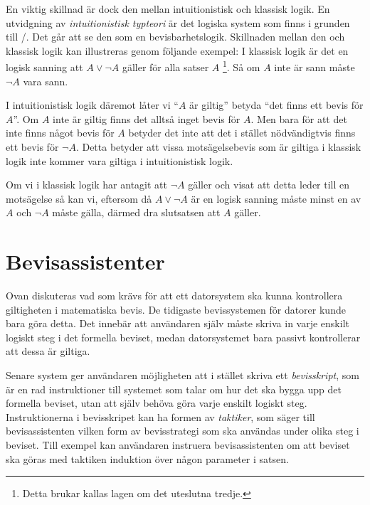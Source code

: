 En viktig skillnad är dock den mellan intuitionistisk och klassisk logik. En
utvidgning av \emph{intuitionistisk typteori}\cite{martin1984intuitionistic} är
det logiska system som finns i grunden till
\coq/\ssr\cite{bertot2004interactive}. Det går att se den som en
bevisbarhetslogik. Skillnaden mellan den och klassisk logik kan illustreras
genom följande exempel: I klassisk logik är det en logisk sanning att $A \lor
\neg A$ gäller för alla satser $A$ \footnote{Detta brukar kallas lagen om det
uteslutna tredje.}. Så om $A$ inte är sann måste $\neg A$ vara
sann\cite{bennet2004forsta}.

I intuitionistisk logik däremot låter vi ``$A$ är giltig'' betyda ``det finns
ett bevis för $A$''. Om $A$ inte är giltig finns det alltså inget bevis för
$A$. Men bara för att det inte finns något bevis för $A$ betyder det inte att
det i stället nödvändigtvis finns ett bevis för $\neg A$. Detta betyder att
vissa motsägelsebevis som är giltiga i klassisk logik inte kommer vara giltiga
i intuitionistisk logik\cite{barendregt2001proofdependent}.

Om vi i klassisk logik har antagit att $\neg A$ gäller och visat att detta
leder till en motsägelse så kan vi, eftersom då $A \lor \neg A$ är en logisk
sanning måste minst en av $A$ och $\neg A$ måste gälla, därmed dra slutsatsen
att $A$ gäller.

\section{Bevisassistenter}
Ovan diskuteras vad som krävs för att ett datorsystem ska kunna kontrollera
giltigheten i matematiska bevis. De tidigaste bevissystemen för datorer kunde
bara göra detta. Det innebär att användaren själv måste skriva in varje enskilt
logiskt steg i det formella beviset, medan datorsystemet bara passivt
kontrollerar att dessa är giltiga.

Senare system ger användaren möjligheten att i stället skriva ett
\emph{bevisskript}, som är en rad instruktioner till systemet som
talar om hur det ska bygga upp det formella beviset, utan att själv
behöva göra varje enskilt logiskt steg.
Instruktionerna i bevisskripet kan ha formen av \emph{taktiker}, som säger
till bevisassistenten vilken form av bevisstrategi som ska användas
under olika steg i beviset.
Till exempel kan användaren instruera bevisassistenten om att beviset ska
göras med taktiken induktion över någon parameter i satsen.

